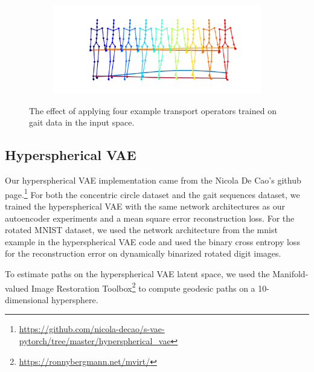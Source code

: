 \documentclass[letterpaper]{article} %
\begin{document}
\begin{figure}[ht]
\begin{subfigure}[b]{0.62\columnwidth}
  \centering
	\includegraphics[width=0.99\columnwidth]{gaitTransOpt_8.png}
	\caption{}
	\label{subfig:inputGait8}
\end{subfigure}



	
  \caption{\label{fig:inputGait} The effect of applying four example transport operators trained on gait data in the input space. }
	
\end{figure}

\subsection{Hyperspherical VAE}\label{sec:hvae}
Our hyperspherical VAE implementation came from the Nicola De Cao's github page.\footnote{\url{https://github.com/nicola-decao/s-vae-pytorch/tree/master/hyperspherical_vae}} For both the concentric circle dataset and the gait sequences dataset, we trained the hyperspherical VAE with the same network architectures as our autoencoder experiments and a mean square error reconstruction loss. For the rotated MNIST dataset, we used the network architecture from the mnist example in the hyperspherical VAE code and used the binary cross entropy loss for the reconstruction error on dynamically binarized rotated digit images.

To estimate paths on the hyperspherical VAE latent space, we used the Manifold-valued Image Restoration Toolbox\footnote{\url{https://ronnybergmann.net/mvirt/}} to compute geodesic paths on a 10-dimensional hypersphere. 

\small


\end{document}
